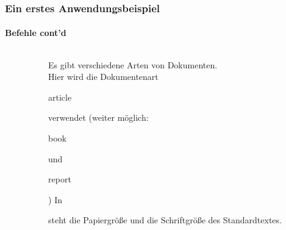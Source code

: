 \begin{frame}
\frametitle{Ein erstes Anwendungsbeispiel}
\framesubtitle{Befehle cont'd}
\begin{columns}
\begin{column}{0.6\textwidth}
\begin{ttfamily}\scriptsize

\end{ttfamily}
\end{column}

\begin{column}{0.4\textwidth}
Es gibt verschiedene Arten von Dokumenten.\\ Hier wird die Dokumentenart
\begin{ttfamily}article\end{ttfamily} verwendet (weiter möglich:
\begin{ttfamily}book\end{ttfamily} und \begin{ttfamily}report\end{ttfamily}) In
\begin{ttfamily}[]\end{ttfamily} steht die Papiergröße und die Schriftgröße des
Standardtextes.\\
\end{column}
\end{columns}
\end{frame}

